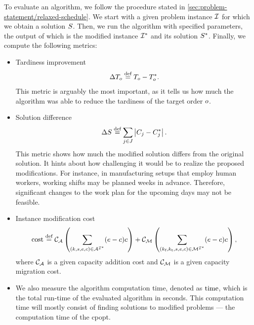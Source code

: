 To evaluate an algorithm, we follow the procedure stated in \cref{sec:problem-statement/relaxed-schedule}.
We start with a given problem instance $\mathcal{I}$ for which we obtain a solution $S$.
Then, we run the algorithm with specified parameters,
the output of which is the modified instance $\mathcal{I}^*$ and its solution $S^*$.
Finally, we compute the following metrics:
\begin{itemize}
    \item
        Tardiness improvement
        $$
        \Delta T_{o} \overset{\text{def}}{=} T_{o} - T_{o}^*.
        $$
        This metric is arguably the most important, as it tells us how much the algorithm was able
        to reduce the tardiness of the target order $o$.
    
    \item
        Solution difference
        $$
        \Delta S_{} \overset{\text{def}}{=} \sum_{j \in J} \left|{C_{j} - C_{j}^*}\right|.
        $$
        This metric shows how much the modified solution differs from the original solution.
        It hints about how challenging it would be to realize the proposed modifications.
        For instance, in manufacturing setups that employ human workers,
        working shifts may be planned weeks in advance.
        Therefore, significant changes to the work plan for the upcoming days
        may not be feasible.

    \item
        Instance modification cost
        $$
        \operatorname{cost} \overset{\text{def}}{=}
            \mathcal{C}_{\mathcal{A}} \left(
                \sum_{(k, s, e, c) \in \mathcal{A}^{\mathcal{I}^*}} (e - c) c
            \right)
            +
            \mathcal{C}_{\mathcal{M}} \left(
                \sum_{(k_\text{f}, k_\text{t}, s, e, c) \in \mathcal{M}^{\mathcal{I}^*}} (e - c) c
            \right),
        $$
        where $\mathcal{C}_{\mathcal{A}}$ is a given capacity addition cost
        and $\mathcal{C}_{\mathcal{M}}$ is a given capacity migration cost.

    \item 
        We also measure the algorithm computation time, denoted as $\operatorname{time}$,
        which is the total run-time of the evaluated algorithm in seconds.
        This computation time will mostly consist of finding solutions to modified problems ---
        the computation time of the \ac{cpopt}.
\end{itemize}

